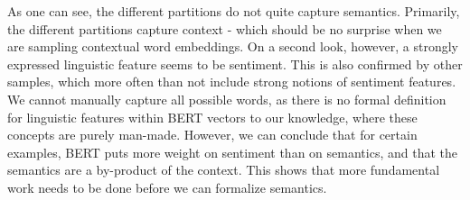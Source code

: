 \documentclass[a4paper,12pt,oneside,openright]{report}
\begin{document}
\begin{tcolorbox}
\label{fig:example_arms_negative_crossed}
\end{tcolorbox}

\quad

As one can see, the different partitions do not quite capture semantics.
Primarily, the different partitions capture context - which should be no surprise when we are sampling contextual word embeddings.
On a second look, however, a strongly expressed linguistic feature seems to be sentiment. 
This is also confirmed by other samples, which more often than not include strong notions of sentiment features.
We cannot manually capture all possible words, as there is no formal definition for linguistic features within BERT vectors to our knowledge, where these concepts are purely man-made. 
However, we can conclude that for certain examples, BERT puts more weight on sentiment than on semantics, and that the semantics are a by-product of the context.
This shows that more fundamental work needs to be done before we can formalize semantics.
\end{document}
